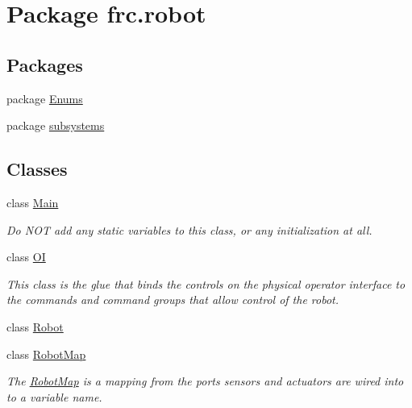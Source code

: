 \hypertarget{namespacefrc_1_1robot}{}\section{Package frc.\+robot}
\label{namespacefrc_1_1robot}
\subsection*{Packages}
\begin{DoxyCompactItemize}
\item 
package \hyperlink{namespacefrc_1_1robot_1_1Enums}{Enums}
\item 
package \hyperlink{namespacefrc_1_1robot_1_1subsystems}{subsystems}
\end{DoxyCompactItemize}
\subsection*{Classes}
\begin{DoxyCompactItemize}
\item 
class \hyperlink{classfrc_1_1robot_1_1Main}{Main}
\begin{DoxyCompactList}\small\item\em Do N\+OT add any static variables to this class, or any initialization at all. \end{DoxyCompactList}\item 
class \hyperlink{classfrc_1_1robot_1_1OI}{OI}
\begin{DoxyCompactList}\small\item\em This class is the glue that binds the controls on the physical operator interface to the commands and command groups that allow control of the robot. \end{DoxyCompactList}\item 
class \hyperlink{classfrc_1_1robot_1_1Robot}{Robot}
\item 
class \hyperlink{classfrc_1_1robot_1_1RobotMap}{Robot\+Map}
\begin{DoxyCompactList}\small\item\em The \hyperlink{classfrc_1_1robot_1_1RobotMap}{Robot\+Map} is a mapping from the ports sensors and actuators are wired into to a variable name. \end{DoxyCompactList}\end{DoxyCompactItemize}
